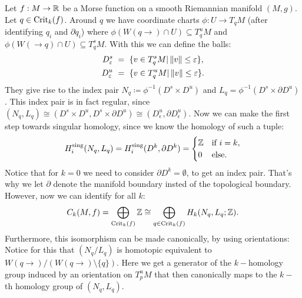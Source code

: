 \begin{example} \label{ex: Critical points as isolated compact invariant subsets}
    Let ${f:M\to \mathbb{R}}$ be a Morse function on a smooth Riemannian manifold $(M,g)$. Let $q\in \mathrm{Crit}_k(f)$. Around $q$ we have coordinate charts $\phi:U \to T_qM$ (after identifying $q_i$ and $\partial q_i$) where  ${\phi(W(q\to)\cap U)\subseteq T_q^{u}M}$ and ${\phi(W(\to q)\cap U)\subseteq T_q^{s}M}$. With this we can define the balls:
    \begin{align*}
        D^{s}_\varepsilon &~=~\{v\in T_q^{s}M | \left\lVert v\right\rVert\leq \varepsilon \}, \\
             D^{u}_\varepsilon &~=~\{v\in T_q^{u }M | \left\lVert v\right\rVert\leq \varepsilon \}. 
    \end{align*} They give rise to the index pair $N_q\coloneq\phi^{-1}( D^{s }\times  D^{u })$ and $L_q=\phi^{-1}( D^{ s}\times \partial D^{u})$. This index pair is in fact regular, since $(N_q,L_q)\cong  (D^{ s}\times  D^{u }, D^{s}\times \partial D^{u}) \cong (D^{u}_{\epsilon},\partial D^{u}_{\epsilon} )$. Now we can make the first step towards singular homology, since we know the homology  of such a tuple:
    \begin{align} \label{eq: homology of indexx pair of critical point}
        H^{\mathrm{sing}}_i(N_q,L_q)=H^{\mathrm{sing}}_i(D^{k},\partial D^{k})=\begin{cases}
            \mathbb{Z} & \text{if } i=k,\\
            0& \text{else. }
        \end{cases}
    \end{align}
    Notice that for $k=0$ we need to consider $\partial D^k=\emptyset$, to get an index pair. That's why we let $\partial$ denote the manifold boundary insted of the topological boundary. However, now we can identify for all $k$: \begin{equation} \label{ kritical points as direct sum of homology groups}
        C_k(M,f)=\bigoplus_{ \mathrm{Crit}_k(f)} \mathbb{Z} \cong \bigoplus_{q\in \mathrm{Crit}_k(f)} H_k(N_q,L_q;\mathbb{Z}).
    \end{equation}
    Furthermore, this isomorphism can be made canonically, by using orientations: Notice for this that $(N_q/L_q)$ is homotopic equivalent to $W(q\to)/ (W(q \to)\setminus \{q\})$. Here we get a generator of the $ k-$homology group induced by an orientation on $T^u_pM$ that then canonically maps to the $k-$th homology group of $(N_q,L_q)$.
\end{example}

